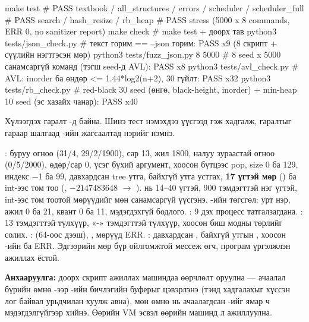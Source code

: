 \begin{codeblock}
make test
#   PASS textbook / all_structures / errors / scheduler / scheduler_full
#   PASS search / hash_resize / rb_heap
#   PASS stress (5000 x 8 commands, ERR 0, no sanitizer report)
make check                             # make test + доорх тав
python3 tests/json_check.py            # текст горим == --json горим: PASS x9 (8 скрипт + сүүлийн нэгтгэсэн мөр)
python3 tests/fuzz_json.py 8 5000      # 8 seed x 5000 санамсаргүй команд (тэгш seed-д AVL): PASS x8
python3 tests/avl_check.py             # AVL: inorder ба өндөр <= 1.44*log2(n+2), 30 гүйлт: PASS x32
python3 tests/rb_check.py              # red-black 30 seed (өнгө, black-height, inorder) + min-heap 10 seed (эс хазайх чанар): PASS x40
\end{codeblock}
Хүлээгдэх гаралт -д байна. Шинэ тест нэмэхдээ  үүсгээд  гэж хадгалж, гаралтыг гараар шалгаад -ийн жагсаалтад нэрийг нэмнэ.

: буруу огноо (31/4, 29/2/1900), сар 13, жил 1800, налуу зураастай огноо (0/5/2000), өдөр/сар 0, үсэг бүхий аргумент, хоосон бүтцээс pop,  size 0 ба 129, индекс $-$1 ба 99, давхардсан tree утга, байхгүй утга устгах, \textbf{17 үгтэй мөр} () ба int-ээс том тоо (, $-2147483648$ $\rightarrow$ ).  нь 14--40 үгтэй, 900 тэмдэгттэй нэг үгтэй, int-ээс том тоотой мөрүүдийг мөн санамсаргүй үүсгэнэ. -ийн төгсгөл: урт нэр, ажил 0 ба 21, квант 0 ба 11, мэдэгдэхгүй бодлого. : 9 дэх процесс татгалзагдана. : 13 тэмдэгттэй түлхүүр, «-» тэмдэгттэй түлхүүр, хоосон биш модны төрлийг солих. :  (64-оос дээш), ,  мөрүүд ERR. : давхардсан , байхгүй утгын , хоосон -ийн  ба  ERR. Эдгээрийн мөр бүр ойлгомжтой  мессеж өгч, програм үргэлжлэн ажиллах ёстой.

\textbf{Анхааруулга:} доорх скрипт ажиллах машиндаа өөрчлөлт оруулна --- ачаалал бүрийн өмнө
-ээр -ийн бичлэгийн буферыг цэвэрлэнэ (тэнд хадгалахыг хүссэн лог
байвал урьдчилан хуулж авна), мөн өмнө нь ачаалагдсан -ийг ямар ч мэдэгдэлгүйгээр
 хийнэ. Өөрийн VM эсвэл өөрийн машинд л ажиллуулна.


